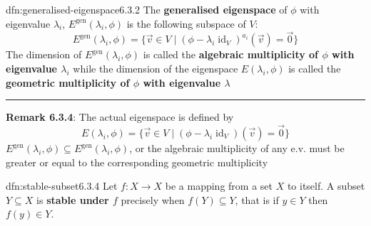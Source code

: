 \documentclass[landscape, 8pt]{extarticle}
\DeclareMathOperator{\id}{id}
\begin{document}
\begin{multicols}{3}
\begin{dfn}{dfn:generalised-eigenspace}{6.3.2}
    The \textbf{generalised eigenspace} of $\phi$ with eigenvalue $\lambda_{i}$, $E^{\text{gen}}(\lambda_{i}, \phi)$ is the following subspace of $V$:
    \[E^{\text{gen}}(\lambda_{i}, \phi) = \{\vec{v}\in V \mid (\phi - \lambda_{i} \id_{V})^{a_{i}} (\vec{v}) = \vec{0}\}\]
    The dimension of $E^{\text{gen}}(\lambda_{i}, \phi)$ is called the \textbf{algebraic multiplicity of $\phi$ with eigenvalue $\lambda_{i}$} while the dimension of the eigenspace $E(\lambda_{i}, \phi)$ is called the \textbf{geometric multiplicity of $\phi$ with eigenvalue $\lambda$}

    \noindent\rule{\textwidth}{0.2pt}
    \textbf{Remark 6.3.4}: The actual eigenspace is defined by
    \[E(\lambda_{i}, \phi) = \{\vec{v}\in V \mid (\phi - \lambda_{i} \id_{V}) (\vec{v}) = \vec{0}\}\]
    $E^{\text{gen}}(\lambda_{i}, \phi) \subseteq E^{\text{gen}}(\lambda_{i}, \phi)$, or the algebraic multiplicity of any e.v. must be greater or equal to the corresponding geometric multiplicity


\end{dfn}

\begin{dfn}{dfn:stable-subset}{6.3.4}
    Let $f : X \to X$ be a mapping from a set $X$ to itself. A subset $Y \subseteq X$ is \textbf{stable under $f$} precisely when $f(Y) \subseteq Y$, that is if $y\in Y$ then $f(y)\in Y$.
\end{dfn}



\end{multicols}
\end{document}
